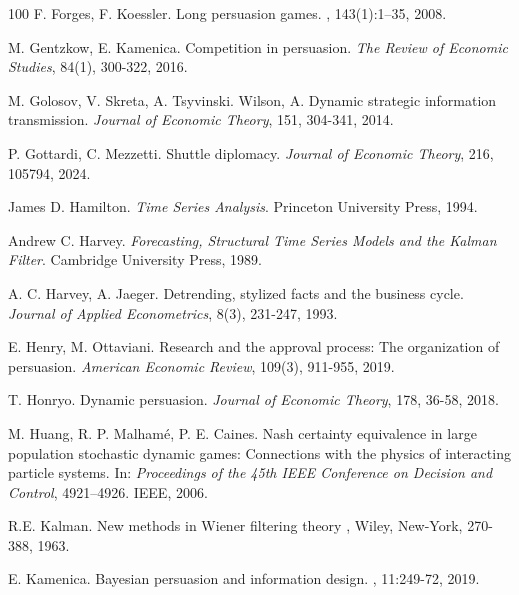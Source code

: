 \documentclass[a4paper,10pt]{article}
\theoremstyle{definition}
\theoremstyle{plain}
\numberwithin{equation}{section}
\begin{document}
\begin{thebibliography}{100}
F. Forges, F. Koessler.
\newblock Long persuasion games.
, 143(1):1--35, 2008.

M. Gentzkow, E. Kamenica. Competition in persuasion. {\em The Review of Economic Studies}, 84(1), 300-322, 2016.

M. Golosov, V. Skreta, A. Tsyvinski. Wilson, A. Dynamic strategic information transmission. {\em Journal of Economic Theory}, 151, 304-341, 2014.

P. Gottardi, C.  Mezzetti. Shuttle diplomacy. {\em Journal of Economic Theory}, 216, 105794, 2024.

James D. Hamilton. {\em Time Series Analysis}.  Princeton University Press, 1994.

Andrew C. Harvey. {\em Forecasting, Structural Time Series Models and the Kalman Filter}. Cambridge University Press, 1989.

A. C. Harvey, A. Jaeger. Detrending, stylized facts and the business cycle. \textit{Journal of Applied Econometrics}, 8(3), 231-247, 1993.


E. Henry, M. Ottaviani. Research and the approval process: The organization of persuasion. {\em American Economic Review}, 109(3), 911-955, 2019.

T. Honryo. Dynamic persuasion. {\em Journal of Economic Theory}, 178, 36-58, 2018.

M. Huang, R. P. Malham\'e, P. E. Caines. Nash certainty equivalence in large population stochastic dynamic games: Connections with the physics of interacting particle systems. In: {\em Proceedings of the 45th IEEE Conference on Decision and Control}, 4921--4926. IEEE, 2006.

R.E. Kalman.
\newblock New methods in Wiener filtering theory
, Wiley, New-York, 270-388, 1963.

E. Kamenica.
\newblock Bayesian persuasion and information design.
, 11:249-72, 2019.


\end{thebibliography}
\end{document}
